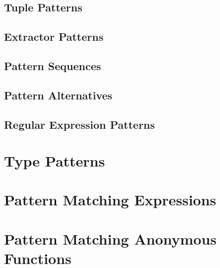 \subsection{Tuple Patterns}

\subsection{Extractor Patterns}
\label{sec:extractor-patterns}

\subsection{Pattern Sequences}

\subsection{Pattern Alternatives}

\subsection{Regular Expression Patterns}

\section{Type Patterns}

\section{Pattern Matching Expressions}

\section{Pattern Matching Anonymous Functions}



